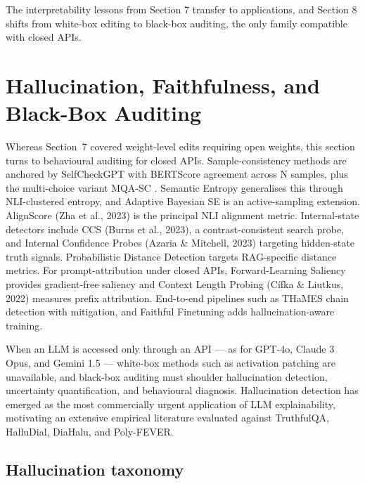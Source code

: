 \documentclass{article}
\begin{document}
The interpretability lessons from Section 7 transfer to applications, and Section 8 shifts from white-box editing to black-box auditing, the only family compatible with closed APIs.

\section{Hallucination, Faithfulness, and Black-Box Auditing}\label{hallucination-faithfulness-and-black-box-auditing}

Whereas Section~7 covered weight-level edits requiring open weights, this section turns to behavioural auditing for closed APIs. Sample-consistency methods are anchored by SelfCheckGPT \citep{manakul2023selfcheckgptzerore} with BERTScore agreement across N samples, plus the multi-choice variant MQA-SC \citep{manakul2023selfcheckgptzerore}. Semantic Entropy \citep{farquhar2024detectinghallucina} generalises this through NLI-clustered entropy, and Adaptive Bayesian SE \citep{sun2026efficienthallucina} is an active-sampling extension. AlignScore (Zha et al., 2023) is the principal NLI alignment metric. Internal-state detectors include CCS (Burns et al., 2023), a contrast-consistent search probe, and Internal Confidence Probes (Azaria \& Mitchell, 2023) targeting hidden-state truth signals. Probabilistic Distance Detection \citep{oblovatny2025probabilisticdista} targets RAG-specific distance metrics. For prompt-attribution under closed APIs, Forward-Learning Saliency \citep{zhang2024acomprehensivestud} provides gradient-free saliency and Context Length Probing (Cífka \& Liutkus, 2022) measures prefix attribution. End-to-end pipelines such as THaMES \citep{liang2024thamesanendtoendto} chain detection with mitigation, and Faithful Finetuning \citep{hu2024understandingreaso} adds hallucination-aware training.

When an LLM is accessed only through an API --- as for GPT-4o, Claude 3 Opus, and Gemini 1.5 --- white-box methods such as activation patching are unavailable, and black-box auditing must shoulder hallucination detection, uncertainty quantification, and behavioural diagnosis. Hallucination detection has emerged as the most commercially urgent application of LLM explainability, motivating an extensive empirical literature evaluated against TruthfulQA, HalluDial, DiaHalu, and Poly-FEVER.

\subsection{Hallucination taxonomy}\label{hallucination-taxonomy}
\end{document}
